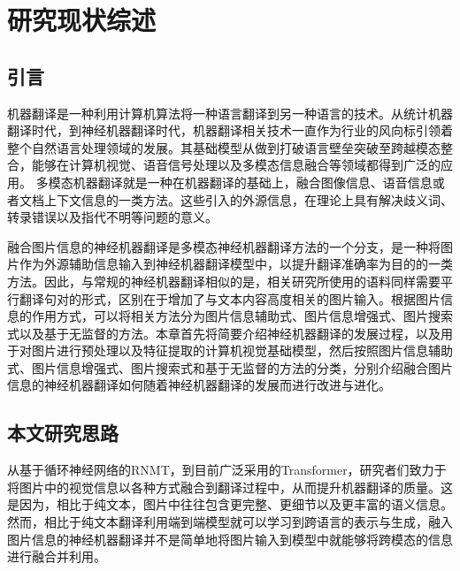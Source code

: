 \chapter{研究现状综述}\label{chap:relatedwork}

\section{引言}
机器翻译是一种利用计算机算法将一种语言翻译到另一种语言的技术。从统计机器翻译时代，到神经机器翻译时代，机器翻译相关技术一直作为行业的风向标引领着整个自然语言处理领域的发展。其基础模型从做到打破语言壁垒突破至跨越模态整合，能够在计算机视觉、语音信号处理以及多模态信息融合等领域都得到广泛的应用。
多模态机器翻译就是一种在机器翻译的基础上，融合图像信息、语音信息或者文档上下文信息的一类方法。这些引入的外源信息，在理论上具有解决歧义词、转录错误以及指代不明等问题的意义。

融合图片信息的神经机器翻译是多模态神经机器翻译方法的一个分支，是一种将图片作为外源辅助信息输入到神经机器翻译模型中，以提升翻译准确率为目的的一类方法。因此，与常规的神经机器翻译相似的是，相关研究所使用的语料同样需要平行翻译句对的形式，区别在于增加了与文本内容高度相关的图片输入。根据图片信息的作用方式，可以将相关方法分为图片信息辅助式、图片信息增强式、图片搜索式以及基于无监督的方法。本章首先将简要介绍神经机器翻译的发展过程，以及用于对图片进行预处理以及特征提取的计算机视觉基础模型，然后按照图片信息辅助式、图片信息增强式、图片搜索式和基于无监督的方法的分类，分别介绍融合图片信息的神经机器翻译如何随着神经机器翻译的发展而进行改进与进化。




%
%
%



\section{本文研究思路}
从基于循环神经网络的RNMT，到目前广泛采用的Transformer，研究者们致力于将图片中的视觉信息以各种方式融合到翻译过程中，从而提升机器翻译的质量。这是因为，相比于纯文本，图片中往往包含更完整、更细节以及更丰富的语义信息。然而，相比于纯文本翻译利用端到端模型就可以学习到跨语言的表示与生成，融入图片信息的神经机器翻译并不是简单地将图片输入到模型中就能够将跨模态的信息进行融合并利用。

